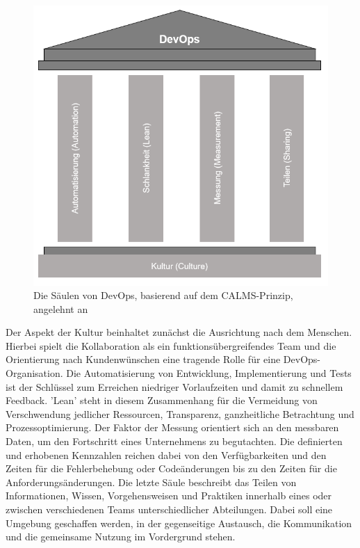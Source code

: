 \begin{figure}[h]
     \centering
     \includegraphics[scale=0.4]{Bilder/Calms.png}
     \caption{Die Säulen von DevOps, basierend auf dem CALMS-Prinzip, angelehnt an \cite{hornby_devops_nodate}}
 \end{figure}

Der Aspekt der Kultur beinhaltet zunächst die Ausrichtung nach dem Menschen. Hierbei spielt die Kollaboration als ein funktionsübergreifendes Team und die Orientierung nach Kundenwünschen eine tragende Rolle für eine DevOps-Organisation. \cite[S.5]{halstenberg_devops_2020} Die Automatisierung von Entwicklung, Implementierung und Tests ist der Schlüssel zum Erreichen niedriger Vorlaufzeiten und damit zu schnellem Feedback. \cite{humble_why_2011} 'Lean' steht in diesem Zusammenhang für die Vermeidung von Verschwendung jedlicher Ressourcen, Transparenz, ganzheitliche Betrachtung und Prozessoptimierung. Der Faktor der Messung orientiert sich an den messbaren Daten, um den Fortschritt eines Unternehmens zu begutachten. Die definierten und erhobenen Kennzahlen reichen dabei von den Verfügbarkeiten und den Zeiten für die Fehlerbehebung oder Codeänderungen bis zu den Zeiten für die Anforderungsänderungen. \cite[S. 7]{halstenberg_devops_2020} Die letzte Säule beschreibt das Teilen von Informationen, Wissen, Vorgehensweisen und Praktiken innerhalb eines oder zwischen verschiedenen Teams unterschiedlicher Abteilungen. \cite{halstenberg_devops_2020} Dabei soll eine Umgebung geschaffen werden, in der gegenseitige Austausch, die Kommunikation und die gemeinsame Nutzung im Vordergrund stehen.\\\\

